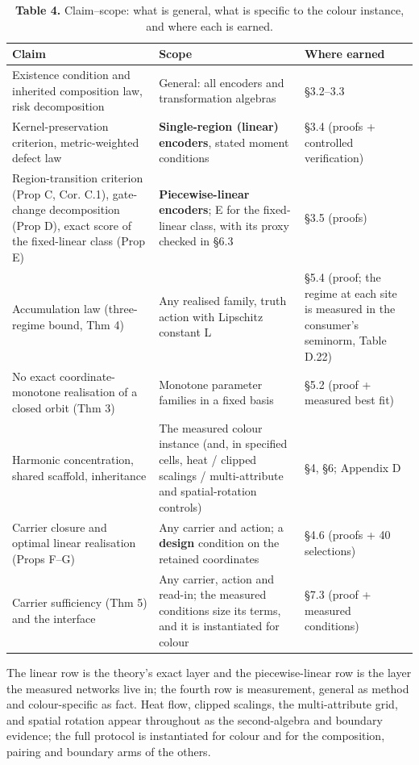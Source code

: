 \begin{table}[t]
\centering
\small
\caption*{\textbf{Table 4.} Claim--scope: what is general, what is specific to the colour instance, and where each is earned.}
\begin{tabularx}{\textwidth}{@{}>{\raggedright\arraybackslash}X >{\raggedright\arraybackslash}X >{\raggedright\arraybackslash}X@{}}
\toprule
\textbf{Claim} & \textbf{Scope} & \textbf{Where earned} \\
\midrule
Existence condition and inherited composition law, risk decomposition & General: all encoders and transformation algebras & \S{}3.2--3.3 \\
Kernel-preservation criterion, metric-weighted defect law & \textbf{Single-region (linear) encoders}, stated moment conditions & \S{}3.4 (proofs + controlled verification) \\
Region-transition criterion (Prop C, Cor. C.1), gate-change decomposition (Prop D), exact score of the fixed-linear class (Prop E) & \textbf{Piecewise-linear encoders}; E for the fixed-linear class, with its proxy checked in \S{}6.3 & \S{}3.5 (proofs) \\
Accumulation law (three-regime bound, Thm 4) & Any realised family, truth action with Lipschitz constant L & \S{}5.4 (proof; the regime at each site is measured in the consumer's seminorm, Table D.22) \\
No exact coordinate-monotone realisation of a closed orbit (Thm 3) & Monotone parameter families in a fixed basis & \S{}5.2 (proof + measured best fit) \\
Harmonic concentration, shared scaffold, inheritance & The measured colour instance (and, in specified cells, heat / clipped scalings / multi-attribute and spatial-rotation controls) & \S{}4, \S{}6; Appendix D \\
Carrier closure and optimal linear realisation (Props F--G) & Any carrier and action; a \textbf{design} condition on the retained coordinates & \S{}4.6 (proofs + 40 selections) \\
Carrier sufficiency (Thm 5) and the interface & Any carrier, action and read-in; the measured conditions size its terms, and it is instantiated for colour & \S{}7.3 (proof + measured conditions) \\
\bottomrule
\end{tabularx}
\end{table}

The linear row is the theory's exact layer and the piecewise-linear row is the layer the measured networks live in; the fourth row is measurement, general as method and colour-specific as fact. Heat flow, clipped scalings, the multi-attribute grid, and spatial rotation appear throughout as the second-algebra and boundary evidence; the full protocol is instantiated for colour and for the composition, pairing and boundary arms of the others.

